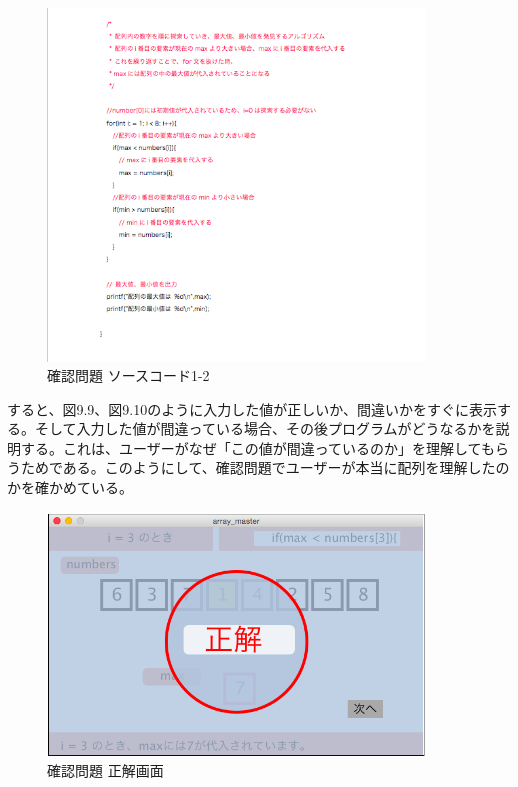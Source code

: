 \documentclass[openany,11pt,papersize]{jsbook}
\begin{document}
\begin{figure}[H]
\begin{center}
\includegraphics[width=10cm, bb=0 0 557 521]{img/9thParagraph/kakuninmondai_04.png}
\end{center}
\caption{確認問題 ソースコード1-2}
\end{figure}

すると、図9.9、図9.10のように入力した値が正しいか、間違いかをすぐに表示する。そして入力した値が間違っている場合、その後プログラムがどうなるかを説明する。これは、ユーザーがなぜ「この値が間違っているのか」を理解してもらうためである。このようにして、確認問題でユーザーが本当に配列を理解したのかを確かめている。


\begin{figure}[H]
\begin{center}
\includegraphics[width=10cm, bb=0 0 645 418]{img/9thParagraph/kakuninmondai_05.png}
\end{center}
\caption{確認問題 正解画面}
\end{figure}
\end{document}
